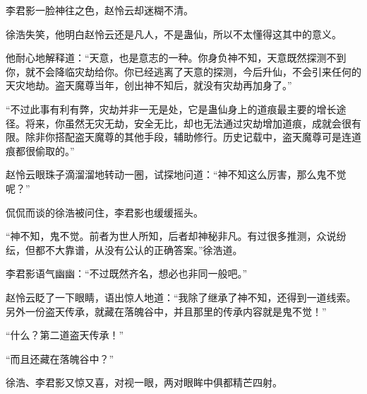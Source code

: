 \begin{this_body}
李君影一脸神往之色，赵怜云却迷糊不清。

徐浩失笑，他明白赵怜云还是凡人，不是蛊仙，所以不太懂得这其中的意义。

他耐心地解释道：“天意，也是意志的一种。你身负神不知，天意既然探测不到你，就不会降临灾劫给你。你已经逃离了天意的探测，今后升仙，不会引来任何的天灾地劫。盗天魔尊当年，创出神不知后，就没有灾劫再加身了。”

“不过此事有利有弊，灾劫并非一无是处，它是蛊仙身上的道痕最主要的增长途径。将来，你虽然无灾无劫，安全无比，却也无法通过灾劫增加道痕，成就会很有限。除非你搭配盗天魔尊的其他手段，辅助修行。历史记载中，盗天魔尊可是连道痕都很偷取的。”

赵怜云眼珠子滴溜溜地转动一圈，试探地问道：“神不知这么厉害，那么鬼不觉呢？”

侃侃而谈的徐浩被问住，李君影也缓缓摇头。

“神不知，鬼不觉。前者为世人所知，后者却神秘非凡。有过很多推测，众说纷纭，但都不大靠谱，从没有公认的正确答案。”徐浩道。

李君影语气幽幽：“不过既然齐名，想必也非同一般吧。”

赵怜云眨了一下眼睛，语出惊人地道：“我除了继承了神不知，还得到一道线索。另外一份盗天传承，就藏在落魄谷中，并且那里的传承内容就是鬼不觉！”

“什么？第二道盗天传承！”

“而且还藏在落魄谷中？”

徐浩、李君影又惊又喜，对视一眼，两对眼眸中俱都精芒四射。

\end{this_body}

